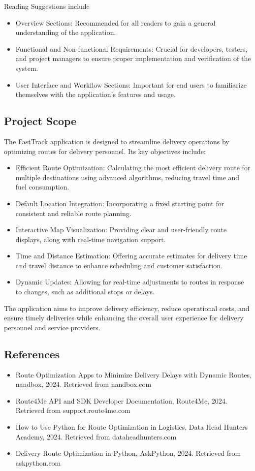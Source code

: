 Reading Suggestions include
\begin{itemize}
    \item Overview Sections: Recommended for all readers to gain a general understanding of the application.
    \item Functional and Non-functional Requirements: Crucial for developers, testers, and project managers to ensure proper implementation and verification of the system.
    \item User Interface and Workflow Sections: Important for end users to familiarize themselves with the application's features and usage.
\end{itemize}
\subsection{Project Scope}

The FastTrack application is designed to streamline delivery operations by optimizing routes for delivery personnel. Its key objectives include:
\begin{itemize}
    \item Efficient Route Optimization: Calculating the most efficient delivery route for multiple destinations using advanced algorithms, reducing travel time and fuel consumption.
    \item Default Location Integration: Incorporating a fixed starting point for consistent and reliable route planning.
    \item Interactive Map Visualization: Providing clear and user-friendly route displays, along with real-time navigation support.
    \item Time and Distance Estimation: Offering accurate estimates for delivery time and travel distance to enhance scheduling and customer satisfaction.
    \item Dynamic Updates: Allowing for real-time adjustments to routes in response to changes, such as additional stops or delays.
\end{itemize}
The application aims to improve delivery efficiency, reduce operational costs, and ensure timely deliveries while enhancing the overall user experience for delivery personnel and service providers.

\subsection{References}

\begin{itemize}
    \item Route Optimization Apps to Minimize Delivery Delays with Dynamic Routes, nandbox, 2024. Retrieved from nandbox.com
    \item Route4Me API and SDK Developer Documentation, Route4Me, 2024. Retrieved from support.route4me.com
    \item How to Use Python for Route Optimization in Logistics, Data Head Hunters Academy, 2024. Retrieved from dataheadhunters.com
    \item Delivery Route Optimization in Python, AskPython, 2024. Retrieved from askpython.com
\end{itemize}

